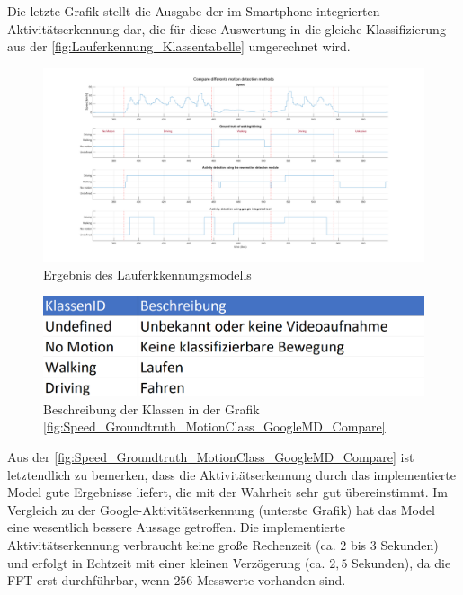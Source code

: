 Die letzte Grafik stellt die Ausgabe der im Smartphone integrierten Aktivitätserkennung dar, die für diese Auswertung in die gleiche Klassifizierung aus der \autoref{fig:Lauferkennung_Klassentabelle} umgerechnet wird.

\begin{figure}
	\centering
	\includegraphics[width=\linewidth]{Bilder/Speed_Groundtruth_MotionClass_GoogleMD_Compare.png}
	\caption{Ergebnis des Lauferkkennungsmodells}
	\label{fig:Speed_Groundtruth_MotionClass_GoogleMD_Compare}
\end{figure}

\begin{figure}
	\centering
	\includegraphics[width=0.6\linewidth]{Bilder/Lauferkennung_Klassentabelle.png}
	\caption{Beschreibung der Klassen in der Grafik \autoref{fig:Speed_Groundtruth_MotionClass_GoogleMD_Compare}}
	\label{fig:Lauferkennung_Klassentabelle}
\end{figure}

Aus der \autoref{fig:Speed_Groundtruth_MotionClass_GoogleMD_Compare} ist letztendlich zu bemerken, dass die Aktivitätserkennung durch das implementierte Model gute Ergebnisse liefert, die mit der Wahrheit sehr gut übereinstimmt. Im Vergleich zu der Google-Aktivitätserkennung (unterste Grafik) hat das Model eine wesentlich bessere Aussage getroffen. Die implementierte Aktivitätserkennung verbraucht keine große Rechenzeit (ca. $2$ bis $3$ Sekunden) und erfolgt in Echtzeit mit einer kleinen Verzögerung (ca. $2,5$ Sekunden), da die FFT erst durchführbar, wenn $256$ Messwerte vorhanden sind.



